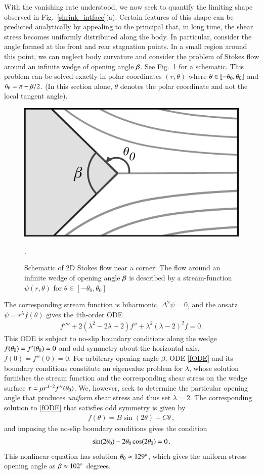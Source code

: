 \documentclass[preprint, 10pt]{elsarticle}
\begin{document}
With the vanishing rate understood, we now seek to quantify the limiting shape observed in Fig.~\ref{shrink_intface}(a). Certain features of this shape can be predicted analytically by appealing to the principal that, in long time, the shear stress becomes uniformly distributed along the body. In particular, consider the angle formed at the front and rear stagnation points. In a small region around this point, we can neglect body curvature and consider the problem of Stokes flow around an infinite wedge of opening angle $\beta$. See Fig.~\ref{corner} for a schematic. This problem can be solved exactly in polar coordinates $(r, \theta)$ where $\theta \in [-\theta_0,\theta_0]$ and $\theta_0 = \pi - \beta/2$. (In this section alone, $\theta$ denotes the polar coordinate and not the local tangent angle). 

\begin{figure}%
\begin{center}
\includegraphics[width = 0.4 \textwidth]{./figs/corner.pdf}
\caption{Schematic of 2D Stokes flow near a corner: The flow around an infinite wedge of opening angle $\beta$ is described by a stream-function $\psi(r,\theta)$ for $\theta \in [-\theta_0, \theta_0]$}.
\label{corner}
\end{center}
\end{figure}
 
The corresponding stream function is biharmonic, $\Delta^2 \psi = 0$, and the ansatz $\psi = r^{\lambda}f(\theta)$ gives the 4th-order ODE~\cite{poz1997}
\begin{align}
\label{fODE}
f'''' + 2(\lambda^2 - 2 \lambda + 2)f'' + \lambda^2(\lambda-2)^2 f = 0.
\end{align}
This ODE is subject to no-slip boundary conditions along the wedge $f(\theta_0) = f'(\theta_0) = 0$ and odd symmetry about the horizontal axis, $f(0) = f''(0) = 0$. For arbitrary opening angle $\beta$, ODE \eqref{fODE} and its boundary conditions constitute an eigenvalue problem for $\lambda$, whose solution furnishes the stream function and the corresponding shear stress on the wedge surface $\tau = \mu r^{\lambda-2} f''(\theta_0)$. We, however, seek to determine the particular opening angle that produces {\em uniform} shear stress and thus set $\lambda = 2$. The corresponding solution to \eqref{fODE} that satisfies odd symmetry is given by
\begin{align}
  f(\theta) = B \sin (2 \theta) + C \theta \, ,
\end{align}
and imposing the no-slip boundary conditions gives the condition
\begin{align}
  \sin(2 \theta_0) - 2 \theta_0 \cos(2 \theta_0) = 0 \, .
\end{align}
This nonlinear equation has solution $\theta_0 \approx 129^\circ$, which gives the uniform-stress opening angle as $\beta \approx 102^\circ$ degrees. 
\end{document}
